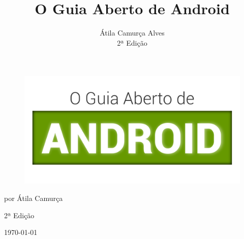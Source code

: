 \documentclass[a4paper,11pt]{book}
\title{O Guia Aberto de Android}
\author{Átila Camurça Alves\\2ª Edição}
\begin{document}

\frontmatter

\pagebreak
\thispagestyle{empty}

\begin{figure}[h]
\centering
\includegraphics[scale=0.55]{img/guia-aberto-android-front.png}
\end{figure}

\begin{flushright}
%
%
%

{\huge
por Átila Camurça
}

\vspace{1in}

{\Large 2ª Edição}

\vspace{0.2in}

{\small \today}

\vfill
\end{flushright}

\clearpage

\tableofcontents
\listoflistings
\listoftables
\listoffigures
\end{document}
